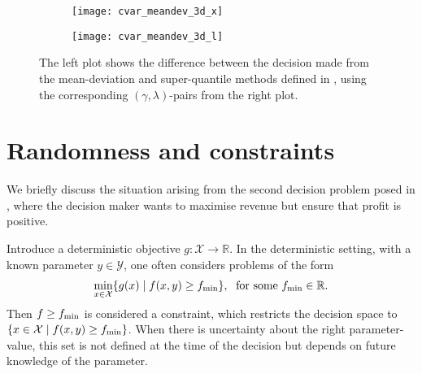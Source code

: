 \documentclass[main.tex]{subfiles}
\begin{document}
\begin{example}
  \begin{figure}[hbtp]
    \centering
    \begin{subfigure}[t]{.5\textwidth}
      \texttt{[image: cvar\_meandev\_3d\_x]}
    \end{subfigure}%
    \begin{subfigure}[t]{.5\textwidth}
      \texttt{[image: cvar\_meandev\_3d\_l]}
    \end{subfigure}
    \caption{The left plot shows the difference between the decision made
      from the mean-deviation and super-quantile methods defined in
      , using the corresponding
      $(\gamma,\lambda)$-pairs from the right plot.
    }\label{fig:cvar_meandev_2d}
  \end{figure}
\end{example}




\section{Randomness and
  constraints}\label{sec:one_randomness_constraints}
We briefly discuss the situation arising from the
second decision problem posed in ,
where the decision maker wants to maximise revenue but ensure that
profit is positive.

Introduce a deterministic objective $g:\mathcal{X}
\to\mathbb{R}$. In the deterministic setting, with a known parameter
$y\in\mathcal{Y}$, one often considers problems of the form
\begin{align}
  \min_{x\in\mathcal{X}}\{g(x)\mid f(x,y)\geq f_{\textnormal{min}} \},\;
  \text{ for some } f_{\textnormal{min}}\in\mathbb{R}.
\end{align}
Then $f\geq f_{\textnormal{min}}$ is considered a constraint, which restricts the
decision space to $\{x\in\mathcal{X}\mid f(x,y)\geq f_{\textnormal{min}}\}$.
When there is uncertainty about the right parameter-value, this set is
not defined at the time of the decision but depends on future knowledge
of the parameter.
\end{document}
